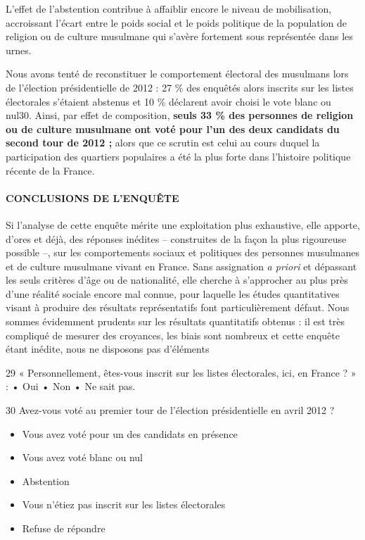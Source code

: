 L'effet de l'abstention contribue à affaiblir encore le niveau de
mobilisation, accroissant l'écart entre le poids social et le poids
politique de la population de religion ou de culture musulmane qui
s'avère fortement sous représentée dans les urnes.

Nous avons tenté de reconstituer le comportement électoral des musulmans
lors de l'élection présidentielle de 2012 : 27 \% des enquêtés alors
inscrits sur les listes électorales s'étaient abstenus et 10 \%
déclarent avoir choisi le vote blanc ou nul30. Ainsi, par effet de
composition, \textbf{seuls 33 \% des personnes de religion ou de culture
musulmane ont voté pour l'un des deux candidats du second tour de 2012
;} alors que ce scrutin est celui au cours duquel la participation des
quartiers populaires a été la plus forte dans l'histoire politique
récente de la France.


\hypertarget{conclusions-de-lenquuxeate}{%
\paragraph{CONCLUSIONS DE L'ENQUÊTE}\label{conclusions-de-lenquuxeate}}


Si l'analyse de cette enquête mérite une exploitation plus exhaustive,
elle apporte, d'ores et déjà, des réponses inédites -- construites de la
façon la plus rigoureuse possible --, sur les comportements sociaux et
politiques des personnes musulmanes et de culture musulmane vivant en
France. Sans assignation \emph{a priori} et dépassant les seuls critères
d'âge ou de nationalité, elle cherche à s'approcher au plus près d'une
réalité sociale encore mal connue, pour laquelle les études
quantitatives visant à produire des résultats représentatifs font
particulièrement défaut. Nous sommes évidemment prudents sur les
résultats quantitatifs obtenus : il est très compliqué de mesurer des
croyances, les biais sont nombreux et cette enquête étant inédite, nous
ne disposons pas d'éléments

29 « Personnellement, êtes-vous inscrit sur les listes électorales, ici,
en France ? » : • Oui • Non • Ne sait pas.

30 Avez-vous voté au premier tour de l'élection présidentielle en avril
2012 ?


\begin{itemize}
\item
  Vous avez voté pour un des candidats en présence
\item
  Vous avez voté blanc ou nul
\item
  Abstention
\item
  Vous n'étiez pas inscrit sur les listes électorales
\item
  Refuse de répondre
\end{itemize}


